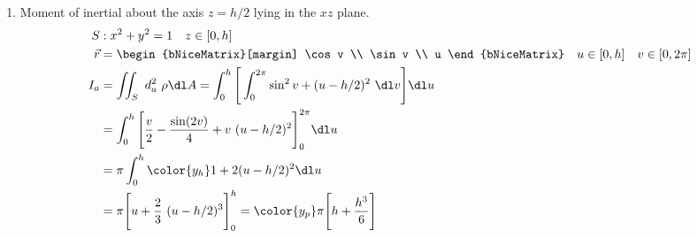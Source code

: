 \begin{enumerate}
    \item Moment of inertial about the axis $ z = h/2 $ lying in the $ xz $ plane.
          \begin{align}
              S       & : x^2 + y^2 = 1 \quad z \in [0, h]                    \\
              \vec{r} & = \begin{bNiceMatrix}[margin]
                              \cos v \\ \sin v \\ u
                          \end{bNiceMatrix}
              \quad u \in [0, h] \quad v \in [0, 2\pi]                        \\
              I_a     & = \iint_S \ d_a^2\ \rho \dl A
              = \int_{0}^{h} \Bigg[\int_{0}^{2\pi} \sin^2 v + (u - h/2)^2
              \ \dl v \Bigg] \dl u                                            \\
                      & = \int_{0}^{h} \Bigg[\frac{v}{2} - \frac{\sin(2v)}{4}
              + v\ (u - h/2)^2 \Bigg]_0^{2\pi} \dl u                          \\
                      & = \pi\int_{0}^{h} {\color{y_h} 1 + 2 (u - h/2)^2}
              \dl u                                                           \\
                      & = \pi\Bigg[ u + \frac{2}{3}\ (u - h/2)^3 \Bigg]_0^h
              = \color{y_p} \pi \Bigg[ h + \frac{h^3}{6} \Bigg]
          \end{align}


\end{enumerate}

